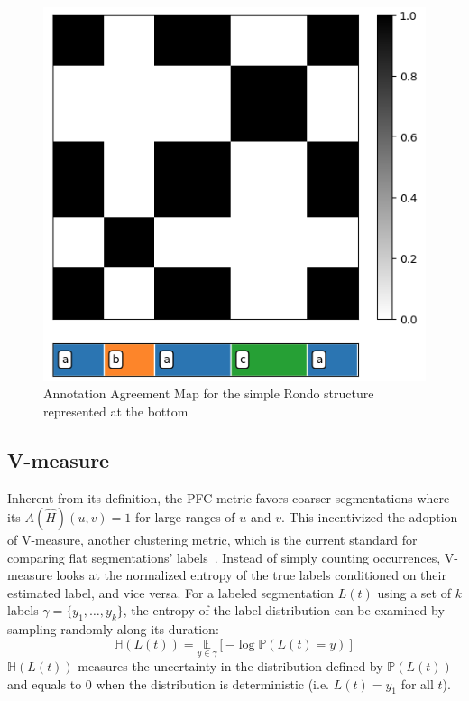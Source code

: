\begin{figure}
    \centering
    \includegraphics[width=\columnwidth]{content/figs/flat_anno_meet.png}
    \caption{Annotation Agreement Map for the simple Rondo structure represented at the bottom}
    \label{fig:flat_anno_meet}
\end{figure}

\subsection{V-measure}
Inherent from its definition, the PFC metric favors coarser segmentations where its $A(\hat{H})(u, v) = 1$ for large ranges of $u$ and $v$.
This incentivized the adoption of V-measure, another clustering metric, which is the current standard for comparing flat segmentations' labels~\cite{lukashevich2008towards}.
Instead of simply counting occurrences, V-measure looks at the normalized entropy of the true labels conditioned on their estimated label, and vice versa.
For a labeled segmentation $L(t)$ using a set of $k$ labels $\gamma = \{y_1, \ldots, y_k\}$, the entropy of the label distribution can be examined by sampling randomly along its duration:
$$\mathbb{H}(L(t)) = \underset{{y\in\gamma}}{\mathbb{E}}[-\log\mathbb{P}(L(t) = y)]$$
$\mathbb{H}(L(t))$ measures the uncertainty in the distribution defined by $\mathbb{P}(L(t))$ and equals to 0 when the distribution is deterministic (i.e. $L(t) = y_1$ for all $t$). 

